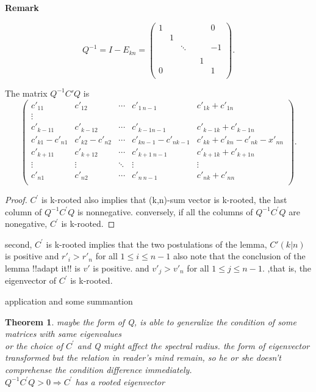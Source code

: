 \documentclass{beamer}
\theoremstyle{plain}
\newtheorem{thm}{Theorem}[section]
\theoremstyle{definition}
\begin{document}
\begin{frame}{\bf Remark}

$$Q^{-1}=I-E_{kn}=\begin{pmatrix}
1 &  & & &  & 0 \\
 & 1 &  &      &  &  \\
 &  & \ddots & &  & -1 \\
 &  &        & &  &  \\
  &  & & & 1 &  \\
0 &  & & &  & 1 \\
\end{pmatrix}.$$

The matrix $Q^{-1}C'Q$ is
$$\begin{pmatrix}
c'_{11}     & c'_{12} & \cdots     & c'_{1\ n-1} & c'_{1k}+c'_{1n} \\
\vdots \\
c'_{k-11}     & c'_{k-1 2}           & \cdots     & c'_{k-1 n-1} & c'_{k-1k}+c'_{k-1n} \\
c'_{k1}-c'_{n1} & c'_{k2}-c'_{n2} &\cdots      &c'_{kn-1}-c'_{nk-1}& c'_{kk}+c'_{kn}-c'_{nk}-x'_{nn}\\
c'_{k+11}     & c'_{k+12}           & \cdots     & c'_{k+1\ n-1} & c'_{k+1k}+c'_{k+1n} \\
\vdots              & \vdots & \ddots              & \vdots & \vdots \\
c'_{n1}             & c'_{n2} & \cdots             & c'_{n\ n-1} & c'_{nk}+c'_{nn} \\
\end{pmatrix}.
$$
\end{frame}

\begin{frame}
    \begin{proof}
        $C^{ '}$ is k-rooted also implies that (k,n)-sum vector is k-rooted,
	the last column of $Q^{-1}C^{ '}Q$ is nonnegative.
	conversely, if all the columns of $Q^{-1}C^{ '}Q$ are nonegative, $C^{ '}$ is k-rooted.
    \end{proof}
	second, $C^{ '}$ is k-rooted implies that the two postulations of the lemma, $C' (k|n)$ is positive and  $r'_i> r'_n$ for all $1\leq i\leq n-1$ also note that the conclusion of the lemma !!adapt it!! is $v'$ is positive. and $v'_j>v'_n$ for all $1\leq j\leq n-1.$ ,that is, the eigenvector of $C^{ '}$ is  k-rooted.

\end{frame}

\begin{frame}{application and some summantion}
    \begin{thm}
        maybe the form of Q, is able to generalize the condition of some matrices with same eigenvalues\\
        or the choice of $C^{ '}$ and Q might affect the spectral radius.
        the form of eigenvector transformed but the relation in reader's mind remain, so he or she doesn't comprehense the condition difference immediately. \\
	$Q^{-1}C^{ '}Q > 0 \Rightarrow C^{ '}$ has a rooted eigenvector

    \end{thm}
\end{frame}
\end{document}
